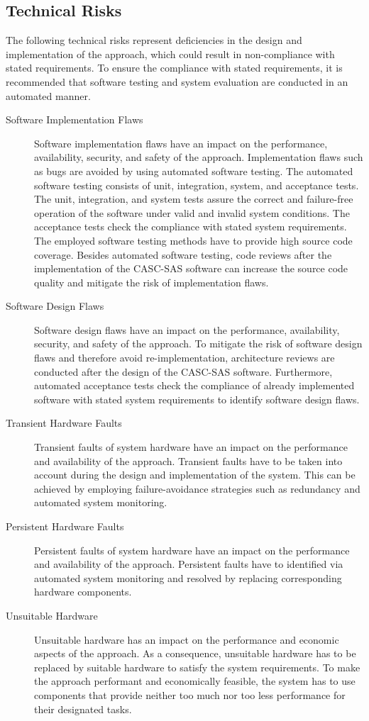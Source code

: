 \subsection{Technical Risks}
\label{sec:risk_assessment_technical}
The following technical risks represent deficiencies in the design and implementation of the approach, which could result in non-compliance with stated requirements.
To ensure the compliance with stated requirements, it is recommended that software testing and system evaluation are conducted in an automated manner.
\begin{description}
    \item[Software Implementation Flaws] Software implementation flaws have an impact on the performance, availability, security, and safety of the approach.
    Implementation flaws such as bugs are avoided by using automated software testing.
    The automated software testing consists of unit, integration, system, and acceptance tests.
    The unit, integration, and system tests assure the correct and failure-free operation of the software under valid and invalid system conditions.
    The acceptance tests check the compliance with stated system requirements.
    The employed software testing methods have to provide high source code coverage.
    Besides automated software testing, code reviews after the implementation of the CASC-SAS software can increase the source code quality and mitigate the risk of implementation flaws.
    \item[Software Design Flaws] Software design flaws have an impact on the performance, availability, security, and safety of the approach.
    To mitigate the risk of software design flaws and therefore avoid re-implementation, architecture reviews are conducted after the design of the CASC-SAS software.
    Furthermore, automated acceptance tests check the compliance of already implemented software with stated system requirements to identify software design flaws.
    \item[Transient Hardware Faults] Transient faults of system hardware have an impact on the performance and availability of the approach.
    Transient faults have to be taken into account during the design and implementation of the system.
    This can be achieved by employing failure-avoidance strategies such as redundancy and automated system monitoring.
    \item[Persistent Hardware Faults] Persistent faults of system hardware have an impact on the performance and availability of the approach.
    Persistent faults have to identified via automated system monitoring and resolved by replacing corresponding hardware components.
    \item[Unsuitable Hardware] Unsuitable hardware has an impact on the performance and economic aspects of the approach.
    As a consequence, unsuitable hardware has to be replaced by suitable hardware to satisfy the system requirements.
    To make the approach performant and economically feasible, the system has to use components that provide neither too much nor too less performance for their designated tasks.
\end{description}


